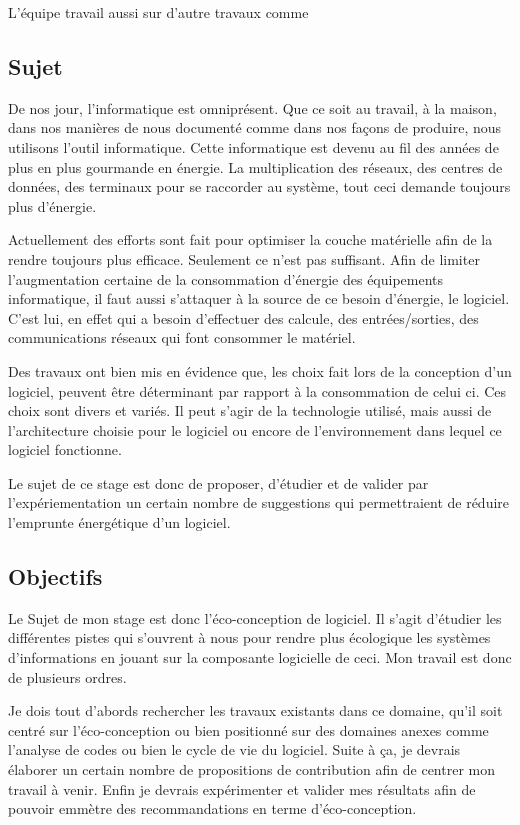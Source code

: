 \documentclass[a4paper, 11pt]{report}
\begin{document}
L'équipe travail aussi sur d'autre travaux comme %

		\subsection{Sujet}
De nos jour, l'informatique est omniprésent. Que ce soit au travail, à la maison, dans nos manières de nous documenté comme dans nos façons de produire, nous utilisons l'outil informatique. Cette informatique est devenu au fil des années de plus en plus gourmande en énergie. La multiplication des réseaux, des centres de données, des terminaux pour se raccorder au système, tout ceci demande toujours plus d'énergie.

Actuellement des efforts sont fait pour optimiser la couche matérielle afin de la rendre toujours plus efficace. Seulement ce n'est pas suffisant. Afin de limiter l'augmentation certaine de la consommation d'énergie des équipements informatique, il faut aussi s'attaquer à la source de ce besoin d'énergie, le logiciel. C'est lui, en effet qui a besoin d'effectuer des calcule, des entrées/sorties, des communications réseaux qui font consommer le matériel.

Des travaux ont bien mis en évidence que, les choix fait lors de la conception d'un logiciel, peuvent être déterminant par rapport à la consommation de celui ci. Ces choix sont divers et variés. Il peut s'agir de la technologie utilisé, mais aussi de l'architecture choisie pour le logiciel ou encore de l'environnement dans lequel ce logiciel fonctionne.

Le sujet de ce stage est donc de proposer, d'étudier et de valider par l'expériementation un certain nombre de suggestions qui permettraient de réduire l'emprunte énergétique d'un logiciel.

		\subsection{Objectifs}
Le Sujet de mon stage est donc l'éco-conception de logiciel. Il s'agit d'étudier les différentes pistes qui s'ouvrent à nous pour rendre plus écologique les systèmes d'informations en jouant sur la composante logicielle de ceci. Mon travail est donc de plusieurs ordres.

Je dois tout d'abords rechercher les travaux existants dans ce domaine, qu'il soit centré sur l'éco-conception ou bien positionné sur des domaines anexes comme l'analyse de codes ou bien le cycle de vie du logiciel. Suite à ça, je devrais élaborer un certain nombre de propositions de contribution afin de centrer mon travail à venir. Enfin je devrais expérimenter et valider mes résultats afin de pouvoir emmètre des recommandations en terme d'éco-conception.
\end{document}
